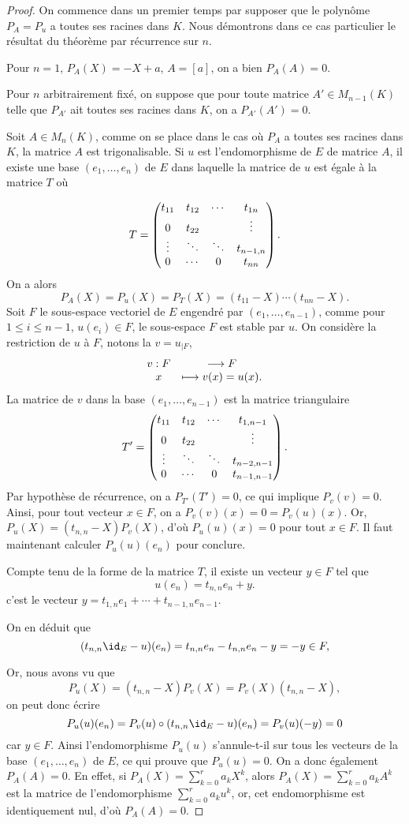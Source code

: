 \documentclass[class=report,crop=false]{standalone}
\begin{document}
\begin{proof}
On commence dans un premier temps par supposer que le polynôme $P_A=P_u$ a toutes ses racines dans $K$. Nous démontrons dans ce cas particulier le résultat du théorème par récurrence sur $n$.

Pour $n=1$, $P_A(X)=-X+a$, $A=[a]$, on a bien $P_A(A)=0$.

Pour $n$ arbitrairement fixé, on suppose que pour toute matrice $A'\in M_{n-1}(K)$ telle que $P_{A'}$ ait toutes ses racines dans $K$, on a $P_{A'}(A')=0$.

Soit $A\in M_n(K)$, comme on se place dans le cas où $P_A$ a toutes ses racines dans $K$, la matrice $A$ est trigonalisable. Si $u$ est l'endomorphisme de $E$ de matrice $A$, il existe une base $(e_1,\dots,e_n)$ de $E$ dans laquelle la matrice de $u$ est égale à la matrice $T$ où

$$T=\left(\begin{matrix}t_{11}&t_{12}&\cdots &t_{1n} \cr 0&t_{22} & &\vdots \cr\vdots &\ddots &\ddots& t_{n-1,n}\cr0&\cdots&0&t_{nn}\end{matrix}\right).$$
On a alors
$$P_A(X)=P_u(X)=P_T(X)=(t_{11}-X)\cdots(t_{nn}-X).$$
Soit $F$ le sous-espace vectoriel de $E$ engendré par $(e_1,\dots,e_{n-1})$, comme pour $1\leq i\leq n-1$, $u(e_i)\in F$, le sous-espace $F$ est stable par  $u$. On considère la restriction de $u$ à $F$, notons la $v=u_{|F}$, 
$$\begin{array}{cc}v : F&\longrightarrow F\cr x &\longmapsto v(x)=u(x).\end{array}$$
La matrice de $v$ dans la base $(e_1,\dots,e_{n-1})$ est la matrice triangulaire
$$T'=\left(\begin{matrix}t_{11}&t_{12}&\cdots &t_{1,n-1} \cr 0&t_{22} & &\vdots \cr\vdots &\ddots &\ddots& t_{n-2,n-1}\cr0&\cdots&0&t_{n-1,n-1}\end{matrix}\right).$$
Par hypothèse de récurrence, on a $P_{T'}(T')=0$, ce qui implique $P_v(v)=0$.
Ainsi, pour tout vecteur $x\in F$, on a $P_v(v)(x)=0=P_v(u)(x)$. Or, $P_u(X)=(t_{n,n}-X)P_v(X)$, d'où $P_u(u)(x)=0$ pour tout $x\in F$. Il faut maintenant calculer $P_u(u)(e_n)$ pour conclure.

Compte tenu de la forme de la matrice $T$, il existe un vecteur $y\in F$ tel que $$u(e_n)=t_{n,n}e_n+y.$$
c'est le vecteur $y=t_{1,n}e_1+\cdots+t_{n-1,n}e_{n-1}.$ 

On en déduit que 
$$(t_{n,n}\id_E-u)(e_n)=t_{n,n}e_n-t_{n,n}e_n-y=-y\in F,$$

Or, nous avons vu que 
$$P_u(X)=(t_{n,n}-X)P_v(X)=P_v(X)(t_{n,n}-X),$$
on peut donc écrire
$$P_u(u)(e_n)=P_v(u)\circ(t_{n,n}\id_E-u)(e_n)=P_v(u)(-y)=0$$
car $y\in F$.
Ainsi l'endomorphisme $P_u(u)$ s'annule-t-il sur tous les vecteurs de la base $(e_1,\dots,e_n)$ de $E$, ce qui prouve que $P_u(u)=0$. On a donc également $P_A(A)=0$. En effet, si $P_A(X)=\sum_{k=0}^r a_k X^k$, alors $P_A(X)=\sum_{k=0}^r a_k A^k$ est la matrice de l'endomorphisme $\sum_{k=0}^r a_k u^k$, or, cet endomorphisme est identiquement nul, d'où $P_A(A)=0$.


\end{proof}
\end{document}

